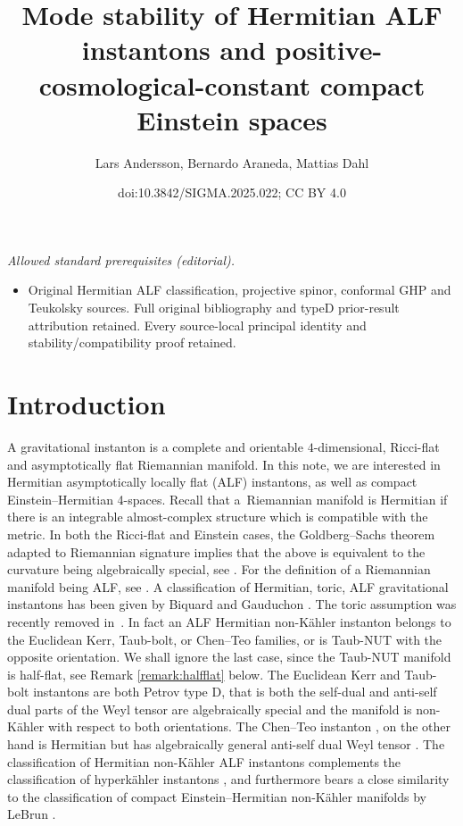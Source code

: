 \documentclass[10pt,a4paper]{amsart}
\title{Mode stability of Hermitian ALF instantons and positive-cosmological-constant compact Einstein spaces}
\author{Lars Andersson, Bernardo Araneda, Mattias Dahl}
\date{doi:10.3842/SIGMA.2025.022; CC BY 4.0}
\numberwithin{equation}{section}
\begin{document}
\maketitle
\noindent\textit{Allowed standard prerequisites (editorial).}\begin{itemize}
\item Original Hermitian ALF classification, projective spinor, conformal GHP and Teukolsky sources. Full original bibliography and typeD prior-result attribution retained. Every source-local principal identity and stability/compatibility proof retained.
\end{itemize}\medskip
\section{Introduction}

A gravitational instanton is a complete and orientable $4$-dimensional, Ricci-flat and asymptotically flat Riemannian manifold. In this note, we are interested in Hermitian asymptotically locally flat (ALF) instantons,
as well as compact Einstein--Hermitian 4-spaces. Recall that a~Riemannian manifold is Hermitian if there is an integrable almost-complex structure which is compatible with the metric. In both the Ricci-flat and Einstein cases, the Goldberg--Sachs theorem adapted to Riemannian signature implies that the above is equivalent to the curvature being algebraically special, see \cite{MR707181, flaherty1976hermitian}.
For the definition of a Riemannian manifold being ALF, see \cite[Definition 1.1]{Biquard:Gauduchon}.
A classification of Hermitian, toric, ALF gravitational instantons has been given by Biquard and Gauduchon \cite{Biquard:Gauduchon}. The toric assumption was recently removed in~\cite{li2023classification}.
In fact an ALF Hermitian non-K\"ahler instanton belongs to the Euclidean Kerr, Taub-bolt, or Chen--Teo families, or is Taub-NUT with the opposite orientation. We shall ignore the last case, since the Taub-NUT manifold is half-flat, see Remark \ref{remark:halfflat} below.
The Euclidean Kerr and Taub-bolt instantons are both Petrov type D, that is both the self-dual and anti-self dual parts of the Weyl tensor are algebraically special and the manifold is non-K\"ahler with respect to both orientations.
The Chen--Teo instanton \cite{2011PhLB..703..359C}, on the other hand is Hermitian but has algebraically general anti-self dual Weyl tensor \cite{aksteiner2021gravitational}. The classification of Hermitian non-K\"ahler ALF instantons complements the classification of hyperk\"ahler instantons \cite{10.4310/ACTA.2021.v227.n2.a2, chen2019gravitational, chen2021gravitational,Kronheimer:1989pu, Minerbe+2011+47+58, 2021arXiv210812991S}, and furthermore bears a close similarity to the classification of compact Einstein--Hermitian non-K\"ahler manifolds by LeBrun \cite{MR2899877}.
\end{document}

